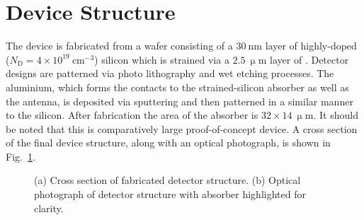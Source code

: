 \documentclass[journal, a4paper]{IEEEtran}
\begin{document}
\section{Device Structure}
The device is fabricated from a wafer consisting of a $30~\mathrm{nm}$ layer of  highly-doped ($N_{\mathrm{D}} = 4 \times 10^{19}~\mathrm{cm^{-3}}$) silicon which is strained via a $2.5~\mathrm{\upmu m}$ layer of . Detector designs are patterned via photo lithography and wet etching processes. The aluminium, which forms the contacts to the strained-silicon absorber as well as the antenna, is deposited via sputtering and then patterned in a similar manner to the silicon. After fabrication the area of the absorber is $32 \times 14~\mathrm{\upmu m}$. It should be noted that this is comparatively large proof-of-concept device. A cross section of the final device structure, along with an optical photograph, is shown in Fig.~\ref{fig:device}.
\begin{figure}[ht]
\begin{center}
\caption{(a) Cross section of fabricated detector structure. (b) Optical photograph of detector structure with absorber highlighted for clarity.}
\label{fig:device}
\end{center}
\end{figure}
%
\end{document}
